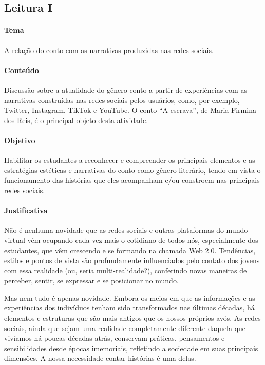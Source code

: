 \documentclass[12pt]{extarticle}
\begin{document}
\subsection{Leitura I}

\paragraph{Tema} A relação do conto com as narrativas produzidas nas redes sociais. 

\paragraph{Conteúdo} Discussão sobre a atualidade do gênero conto a partir
de experiências com as narrativas construídas nas redes sociais pelos
usuários, como, por exemplo, Twitter, Instagram, TikTok e YouTube. O
conto ``A escrava'', de Maria Firmina dos Reis, é o principal objeto
desta atividade.

\paragraph{Objetivo} Habilitar os estudantes a reconhecer e compreender os
principais elementos e as estratégias estéticas e narrativas do conto
como gênero literário, tendo em vista o funcionamento das histórias que
eles acompanham e/ou constroem nas principais redes sociais.

\paragraph{Justificativa} Não é nenhuma novidade que as redes sociais e
outras plataformas do mundo virtual vêm ocupando cada vez mais o
cotidiano de todos nós, especialmente dos estudantes, que vêm crescendo
e se formando na chamada Web 2.0. Tendências, estilos e pontos de vista
são profundamente influenciados pelo contato dos jovens com essa
realidade (ou, seria multi-realidade?), conferindo novas maneiras de
perceber, sentir, se expressar e se posicionar no mundo.

Mas nem tudo é apenas novidade. Embora os meios em que as informações e
as experiências dos indivíduos tenham sido transformados nas últimas
décadas, há elementos e estruturas que são mais antigos que os nossos
próprios avós. As redes sociais, ainda que sejam uma realidade
completamente diferente daquela que vivíamos há poucas décadas atrás,
conservam práticas, pensamentos e sensibilidades desde épocas
imemoriais, refletindo a sociedade em suas principais dimensões. A nossa
necessidade contar histórias é uma delas.
\end{document}
